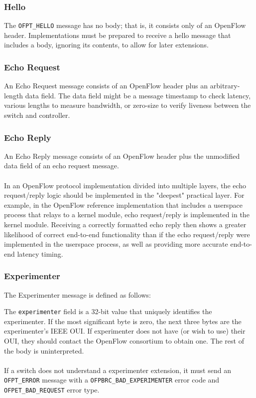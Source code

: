 \subsubsection{Hello}
The \verb|OFPT_HELLO| message has no body; that is, it consists only of an OpenFlow header. Implementations must be prepared to receive a hello message that includes a body, ignoring its contents, to allow for later extensions. 

\subsubsection{Echo Request}
An Echo Request message consists of an OpenFlow header plus an arbitrary-length data field.  The data field might be a message timestamp to check latency, various lengths to measure bandwidth, or zero-size to verify liveness between the switch and controller.

\subsubsection{Echo Reply}
An Echo Reply message consists of an OpenFlow header plus the unmodified data field of an echo request message.
\\\\
In an OpenFlow protocol implementation divided into multiple layers, the echo request/reply logic should be implemented in the "deepest" practical layer.  For example, in the OpenFlow reference implementation that includes a userspace process that relays to a kernel module, echo request/reply is implemented in the kernel module.  Receiving a correctly formatted echo reply then shows a greater likelihood of correct end-to-end functionality than if the echo request/reply were implemented in the userspace process, as well as providing more accurate end-to-end latency timing.

\subsubsection{Experimenter}
The Experimenter message is defined as follows:


The \verb|experimenter| field is a 32-bit value that uniquely identifies the experimenter. If the most significant byte is zero, the next three bytes are the experimenter's IEEE OUI. If experimenter does not have (or wish to use) their OUI, they should contact the OpenFlow consortium to obtain one. The rest of the body is uninterpreted.
\\\\
If a switch does not understand a experimenter extension, it must send an \verb|OFPT_ERROR| message with a \verb|OFPBRC_BAD_EXPERIMENTER| error code and \verb|OFPET_BAD_REQUEST| error type. 

